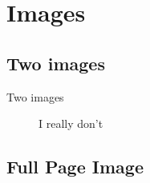 \section{Images}





\subsection{Two images}


\begin{frame}{Two images}
\begin{figure}[!htb]
	\centering
		\caption{
			I really don't 
			\label{fig:noidea1}
		}%
	\endminipage\hspace{1cm}   
		\caption{
			\label{fig:noidea2}
		}%
	\endminipage
\end{figure}
\end{frame}










\subsection{Full Page Image}





